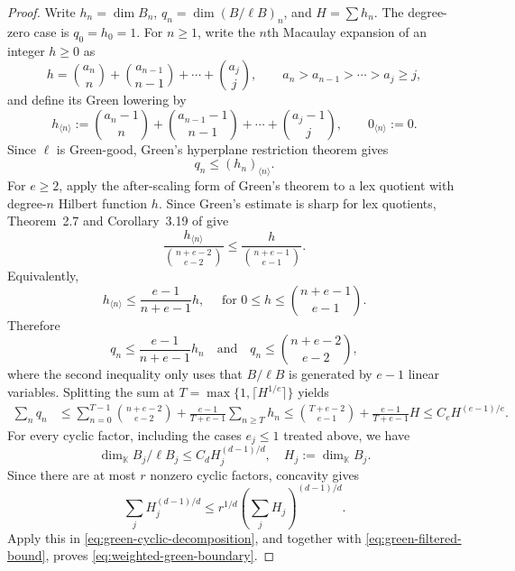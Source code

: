 \documentclass[11pt,reqno]{amsart}
\newcommand\K{\ensuremath{\mathbb{K}}}
\theoremstyle{definition}
\theoremstyle{plain}
\numberwithin{equation}{section}
\begin{document}
\begin{proof}
Write $h_n=\dim B_n$, $q_n=\dim(B/\ell B)_n$, and $H=\sum h_n$. The degree-zero case is $q_0=h_0=1$.  For $n\geq1$, write the
$n$th Macaulay expansion of an integer $h\geq0$ as
\begin{equation*}
 h=\binom{a_n}{n}+\binom{a_{n-1}}{n-1}+\cdots+\binom{a_j}{j},
 \qquad
 a_n>a_{n-1}>\cdots>a_j\geq j,
\end{equation*}
and define its Green lowering by
\begin{equation*}
 h_{\langle n\rangle}
 :=
 \binom{a_n-1}{n}
 +\binom{a_{n-1}-1}{n-1}
 +\cdots+
 \binom{a_j-1}{j},
 \qquad
 0_{\langle n\rangle}:=0.
\end{equation*}
Since $\ell$ is Green-good, Green's hyperplane restriction theorem gives
\begin{equation*}
 q_n\leq(h_n)_{\langle n\rangle}.
\end{equation*}
For $e\geq2$, apply the after-scaling form of Green's theorem to a
lex quotient with degree-$n$ Hilbert function $h$.  Since Green's
estimate is sharp for lex quotients, Theorem~2.7 and
Corollary~3.19 of \cite{Greco2015} give
\begin{equation*}
    \frac{h_{\langle n\rangle}}
         {\binom{n+e-2}{e-2}}
    \leq
    \frac{h}
         {\binom{n+e-1}{e-1}}.
\end{equation*}
Equivalently,
\begin{equation*}
    h_{\langle n\rangle}
    \leq
    \frac{e-1}{n+e-1}h,
    \quad \text{ for }
    0\leq h\leq\binom{n+e-1}{e-1}.
\end{equation*}
Therefore
\begin{equation}\label{eq:green-degree-bounds}
 q_n\le \frac{e-1}{n+e-1}h_n \quad \text{and}\quad
 q_n\le\binom{n+e-2}{e-2},
\end{equation}
where the second inequality only uses that $B/\ell B$ is generated by $e-1$
linear variables.  Splitting the sum at
$T=\max\{1,\lceil H^{1/e}\rceil\}$ yields
\begin{align*}
 \sum_nq_n&\le \sum_{n=0}^{T-1}\binom{n+e-2}{e-2}+\frac{e-1}{T+e-1}\sum_{n\ge T}h_n\le\binom{T+e-2}{e-1}+\frac{e-1}{T+e-1}H
 \le C_eH^{(e-1)/e}.
\end{align*}
For every cyclic factor, including the cases $e_j\leq1$ treated above,
we have
\begin{equation*}
    \dim_{\K}B_j/\ell B_j
    \leq
    C_d H_j^{(d-1)/d},
    \quad
    H_j:=\dim_{\K}B_j.
\end{equation*}
Since there are at most $r$ nonzero cyclic factors, concavity gives
\begin{equation*}
    \sum_jH_j^{(d-1)/d}
    \leq
    r^{1/d}
    \left(\sum_jH_j\right)^{(d-1)/d}.
\end{equation*}
Apply this in \eqref{eq:green-cyclic-decomposition}, and together with
\eqref{eq:green-filtered-bound}, proves
\eqref{eq:weighted-green-boundary}.
\end{proof}
\end{document}
